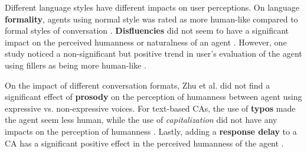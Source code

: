 \documentclass[sigconf,screen,review, anonymous]{acmart}
\newcommand{\cmt}[1]{}%
\begin{document}


Different language styles have different impacts on user perceptions. On language \textbf{formality}, agents using normal style was rated as more human-like compared to formal styles of conversation \cite{ouchi2019should}\cmt{[59]}. \textbf{Disfluencies} did not seem to have a significant impact on the perceived humanness or naturalness of an agent \cite{jeong2019exploring}\cmt{[10]}\cite{pfeifer2009should}\cmt{[12]}. However, one study noticed a non-significant but positive trend in user's evaluation of the agent using fillers as being more human-like \cite{jeong2019exploring}\cmt{[10]}.




On the impact of different conversation formats, Zhu et al. did not find a significant effect of \textbf{prosody} on the perception of humanness between agent using expressive vs. non-expressive voices. For text-based CAs, the use of \textbf{typos} made the agent seem less human, while the use of \textit{capitalization} did not have any impacts on the perception of humanness \cite{westerman2019believe}\cmt{[9]}. Lastly, adding a \textbf{response delay} to a CA has a significant positive effect in the perceived humanness of the agent \cite{gnewuch2018faster}\cmt{[19]}. 



\end{document}
